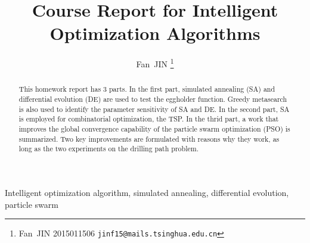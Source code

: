 \documentclass{IEEEtran}
\title{Course Report for Intelligent Optimization Algorithms}
\author{
    Fan~JIN
    \thanks{Fan~JIN 2015011506  \texttt{jinf15@mails.tsinghua.edu.cn}}
}
\begin{document}
\maketitle
\begin{abstract}
    This homework report has 3 parts. 
    In the first part, simulated annealing (SA) and differential evolution (DE) are used to test the eggholder function.
    Greedy metasearch is also used to identify the parameter sensitivity of SA and DE.
    In the second part, SA is employed for combinatorial optimization, the TSP. 
    In the thrid part, a work that improves the global convergence capability of the particle swarm optimization (PSO) is summarized.
    Two key improvements are formulated with reasons why they work, as long as the two experiments on the drilling path problem.
\end{abstract}
\begin{IEEEkeywords}
    Intelligent optimization algorithm, simulated annealing, differential evolution, particle swarm
\end{IEEEkeywords}
\end{document}
